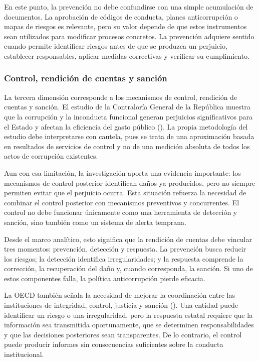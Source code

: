 \documentclass[Afour,sageh,times]{sagej}
\begin{document}
En este punto, la prevención no debe confundirse con una simple acumulación de documentos. La aprobación de códigos de conducta, planes anticorrupción o mapas de riesgos es relevante, pero su valor depende de que estos instrumentos sean utilizados para modificar procesos concretos. La prevención adquiere sentido cuando permite identificar riesgos antes de que se produzca un perjuicio, establecer responsables, aplicar medidas correctivas y verificar su cumplimiento.

\subsubsection{Control, rendición de cuentas y sanción}

La tercera dimensión corresponde a los mecanismos de control, rendición de cuentas y sanción. El estudio de la Contraloría General de la República muestra que la corrupción y la inconducta funcional generan perjuicios significativos para el Estado y afectan la eficiencia del gasto público (\citealp{contraloria2020corrupcion}). La propia metodología del estudio debe interpretarse con cautela, pues se trata de una aproximación basada en resultados de servicios de control y no de una medición absoluta de todos los actos de corrupción existentes.

Aun con esa limitación, la investigación aporta una evidencia importante: los mecanismos de control posterior identifican daños ya producidos, pero no siempre permiten evitar que el perjuicio ocurra. Esta situación refuerza la necesidad de combinar el control posterior con mecanismos preventivos y concurrentes. El control no debe funcionar únicamente como una herramienta de detección y sanción, sino también como un sistema de alerta temprana.

Desde el marco analítico, esto significa que la rendición de cuentas debe vincular tres momentos: prevención, detección y respuesta. La prevención busca reducir los riesgos; la detección identifica irregularidades; y la respuesta comprende la corrección, la recuperación del daño y, cuando corresponda, la sanción. Si uno de estos componentes falla, la política anticorrupción pierde eficacia.

La OECD también señala la necesidad de mejorar la coordinación entre las instituciones de integridad, control, justicia y sanción (\citealp{oecd2017integrity,oecd2024sistema}). Una entidad puede identificar un riesgo o una irregularidad, pero la respuesta estatal requiere que la información sea transmitida oportunamente, que se determinen responsabilidades y que las decisiones posteriores sean transparentes. De lo contrario, el control puede producir informes sin consecuencias suficientes sobre la conducta institucional.
\end{document}
